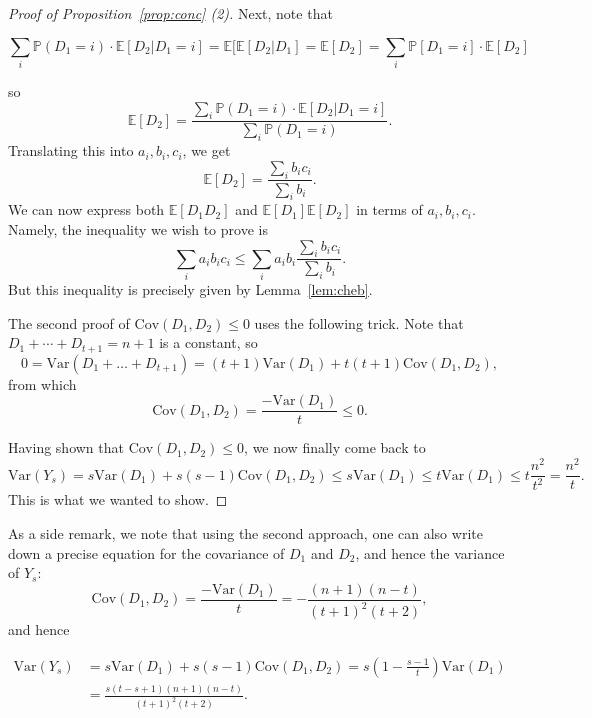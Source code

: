 \documentclass{amsart}
\theoremstyle{definition}
\newcommand{\Var}{\mathrm{Var}}
\newcommand{\Cov}{\mathrm{Cov}}
\begin{document}
\begin{proof}[Proof of Proposition~\ref{prop:conc} (2)]
Next, note that

\[\sum_i \mathbb{P}(D_1=i)\cdot\mathbb{E}[D_2|D_1=i]=\mathbb{E}[\mathbb{E}[D_2|D_1]=\mathbb{E}[D_2]=\sum_{i}\mathbb{P}[D_1=i]\cdot\mathbb{E}[D_2]\]

so
\[\mathbb{E}[D_2]=\frac{\sum_i \mathbb{P}(D_1=i)\cdot\mathbb{E}[D_2|D_1=i]}{\sum_{i}\mathbb{P}(D_1=i)}.\]
Translating this into $a_i,b_i,c_i$, we get
\[\mathbb{E}[D_2]=\frac{\sum_i b_i c_i}{\sum_i b_i}.\]
We can now express both $\mathbb{E}[D_1 D_2]$ and $\mathbb{E}[D_1]\mathbb{E}[D_2]$ in terms of $a_i,b_i,c_i$. Namely, the inequality we wish to prove is
\[\sum_i a_i b_i c_i\leq \sum_i a_i b_i \frac{\sum_i b_i c_i}{\sum_i b_i}.\]
But this inequality is precisely given by Lemma~\ref{lem:cheb}. 

The second proof of $\Cov(D_1,D_2)\leq 0$ uses the following trick. Note that $D_1+\cdots+D_{t+1}=n+1$ is a constant, so
\[0=\Var(D_1+\ldots+D_{t+1})=(t+1)\Var(D_1)+t(t+1)\Cov(D_1,D_2),\]
from which
\[\Cov(D_1,D_2)=\frac{-\Var(D_1)}{t}\leq 0.\]

Having shown that $\Cov(D_1,D_2)\leq 0$, we now finally come back to 
\[\Var(Y_s)=s\Var(D_1)+s(s-1)\Cov(D_1,D_2)\leq s\Var(D_1)\leq t\Var(D_1)\leq t\frac{n^2}{t^2}=\frac{n^2}{t}.\]
This is what we wanted to show.
\end{proof}



As a side remark, we note that using the second approach, one can also write down a precise equation for the covariance of $D_1$ and $D_2$, and hence the variance of $Y_s$:
\[\Cov(D_1,D_2)=\frac{-\Var(D_1)}{t}=-\frac{(n+1)(n-t)}{(t+1)^2(t+2)},\]
and hence

\begin{align*}
    \Var(Y_s)&=s\Var(D_1)+s(s-1)\Cov(D_1,D_2)=s\left(1-\frac{s-1}{t}\right)\Var(D_1)\\
    &=\frac{s(t-s+1)(n+1)(n-t)}{(t+1)^2(t+2)}.
\end{align*}
\end{document}
